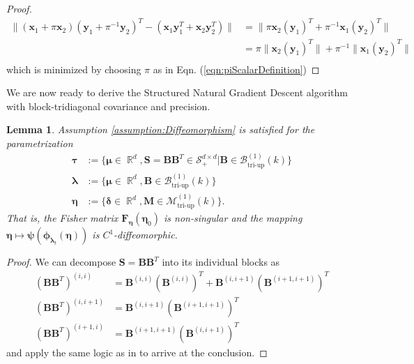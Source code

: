 \documentclass[a4paper, 11pt, oneside]{scrartcl}
\theoremstyle{break}
\newtheorem{lemma}{Lemma}[section]
\DeclareMathOperator{\Real}{\mathbb{R}}
\newcommand{\matr}[1]{\boldsymbol{#1}}
\newcommand{\set}[1]{\mathcal{#1}}
\numberwithin{equation}{section}
\begin{document}
				\begin{proof}
					\begin{align*}
						\| (\matr{x}_1 + \pi \matr{x}_2) (\matr{y}_1 + \pi^{-1} \matr{y}_2)^T - (\matr{x}_1 \matr{y}_1^T + \matr{x}_2 \matr{y}_2^T) \| 
						&= \| \pi \matr{x}_2 (\matr{y}_1)^T + \pi^{-1} \matr{x}_1 (\matr{y}_2)^T \| \\
						&= \pi \| \matr{x}_2 (\matr{y}_1)^T \| + \pi^{-1} \| \matr{x}_1 (\matr{y}_2)^T \| \\
					\end{align*}
					which is minimized by choosing $\pi$ as in Eqn. (\ref{eqn:piScalarDefinition})
				\end{proof}

				We are now ready to derive the Structured Natural Gradient Descent algorithm with block-tridiagonal covariance and precision.

				\begin{lemma}
					Assumption \ref{assumption:Diffeomorphism} is satisfied for the parametrization 
					\begin{align*}
						\matr{\tau} &:= \{\matr{\mu} \in \Real^d, \matr{S} = \matr{B}\matr{B}^T \in \set{S}_+^{d \times d} | \matr{B}  \in \set{B}_{\text{tri-up}}^{(1)}(k) \} \\
						\matr{\lambda} &:= \{\matr{\mu} \in \Real^d, \matr{B} \in \set{B}_{\text{tri-up}}^{(1)}(k) \} \\
						\matr{\eta} &:= \{\matr{\delta} \in \Real^d, \matr{M} \in \set{M}_{\text{tri-up}}^{(1)}(k) \}.
					\end{align*}
					That is, the Fisher matrix $\matr{F}_{\matr{\eta}} (\matr{\eta}_0)$ is non-singular and the mapping $\matr{\eta} \mapsto \matr{\psi} (\matr{\phi}_{\matr{\lambda}_t} (\matr{\eta}))$ is $C^1$-diffeomorphic.
				\end{lemma}

				\begin{proof}
					We can decompose $\matr{S} = \matr{B} \matr{B}^T$ into its individual blocks as 
					\begin{align*}
						(\matr{B} \matr{B}^T)^{(i, i)} &=  \matr{B}^{(i, i)} (\matr{B}^{(i, i)})^T + \matr{B}^{(i, i+1)} (\matr{B}^{(i+1, i+1)})^T \\
						(\matr{B} \matr{B}^T)^{(i, i+1)} &=  \matr{B}^{(i, i+1)} (\matr{B}^{(i+1, i+1)})^T \\
						(\matr{B} \matr{B}^T)^{(i+1, i)} &=  \matr{B}^{(i+1, i+1)} (\matr{B}^{(i, i+1)})^T
					\end{align*}
					and apply the same logic as in \parencite[App.~J.1.3]{LNK+21} to arrive at the conclusion.
				\end{proof}
\end{document}
